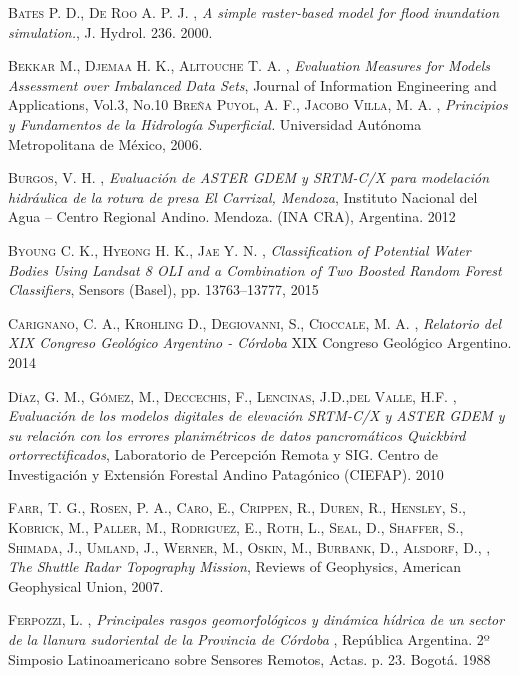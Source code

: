 \begin{thebibliography}{9}

 \textsc{Bates P. D., De Roo A. P. J. } , \textit{A simple raster-based model for flood inundation simulation.},   J. Hydrol. 236. 2000.

 \textsc{Bekkar M., Djemaa H. K., Alitouche T. A.} , \textit{Evaluation Measures for Models Assessment over Imbalanced Data Sets}, Journal of Information Engineering and Applications, Vol.3, No.10
 \textsc{Breña Puyol, A. F., Jacobo Villa, M. A.} , \textit{Principios y Fundamentos de la Hidrología Superficial.} Universidad Autónoma Metropolitana de México, 2006.

 \textsc{Burgos, V. H.} , \textit{Evaluación de ASTER GDEM y SRTM-C/X para modelación hidráulica de la rotura de presa El Carrizal, Mendoza}, Instituto Nacional del Agua – Centro Regional Andino. Mendoza. (INA CRA), Argentina. 2012

 \textsc{Byoung C. K., Hyeong H. K., Jae Y. N.} , \textit{Classification of Potential Water Bodies Using Landsat 8 OLI and a Combination of Two Boosted Random Forest Classifiers}, Sensors (Basel), pp. 13763–13777, 2015

 \textsc{Carignano, C. A., Krohling D., Degiovanni, S., Cioccale, M. A.} , \textit{Relatorio del XIX Congreso Geológico Argentino - Córdoba} XIX Congreso Geológico Argentino. 2014

 \textsc{Díaz, G. M., Gómez, M., Deccechis, F., Lencinas, J.D.,del Valle, H.F.} , \textit{Evaluación de los modelos digitales de elevación SRTM-C/X y ASTER GDEM y su relación con los errores planimétricos de datos pancromáticos Quickbird ortorrectificados}, Laboratorio de Percepción Remota y SIG. Centro de Investigación y Extensión Forestal Andino Patagónico (CIEFAP). 2010

 \textsc{Farr, T. G., Rosen, P. A., Caro, E., Crippen, R., Duren, R., Hensley, S., Kobrick, M., Paller, M., Rodriguez, E., Roth, L., Seal, D., Shaffer, S., Shimada, J., Umland, J., Werner, M., Oskin, M., Burbank, D., Alsdorf, D.,} , \textit{The Shuttle Radar Topography Mission}, Reviews of Geophysics, American Geophysical Union, 2007.

 \textsc{Ferpozzi, L.} , \textit{Principales rasgos geomorfológicos y dinámica hídrica de un sector de la llanura sudoriental de la Provincia de Córdoba} , República Argentina. 2º Simposio Latinoamericano sobre Sensores Remotos, Actas. p. 23. Bogotá. 1988


\end{thebibliography}

